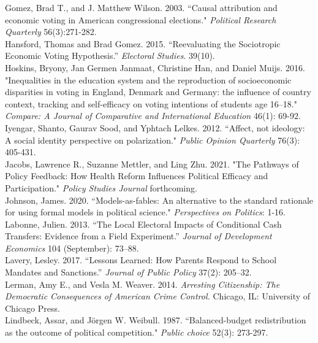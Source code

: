 \documentclass[12pt]{paper}
\begin{document}
\begin{hangparas}{.25in}{1}
Gomez, Brad T., and J. Matthew Wilson. 2003. ``Causal attribution and economic voting in American congressional elections." \textit{Political Research Quarterly} 56(3):271-282.
\\

Hansford, Thomas and Brad Gomez. 2015. ``Reevaluating the Sociotropic Economic Voting Hypothesis.” \textit{Electoral Studies}. 39(10).
\\

Hoskins, Bryony, Jan Germen Janmaat, Christine Han, and Daniel Muijs. 2016. "Inequalities in the education system and the reproduction of socioeconomic disparities in voting in England, Denmark and Germany: the influence of country context, tracking and self-efficacy on voting intentions of students age 16–18." \textit{Compare: A Journal of Comparative and International Education} 46(1): 69-92.
\\

Iyengar, Shanto, Gaurav Sood, and Yphtach Lelkes. 2012. ``Affect, not ideology: A social identity perspective on polarization." \textit{Public Opinion Quarterly} 76(3): 405-431.
\\

Jacobs, Lawrence R., Suzanne Mettler, and Ling Zhu. 2021. "The Pathways of Policy Feedback: How Health Reform Influences Political Efficacy and Participation." \textit{Policy Studies Journal} forthcoming.
\\

Johnson, James. 2020. ``Models-as-fables: An alternative to the standard rationale for using formal models in political science." \textit{Perspectives on Politics}: 1-16.
\\

Labonne, Julien. 2013. ``The Local Electoral Impacts of Conditional Cash Transfers: Evidence from a Field Experiment.” \textit{Journal of Development Economics} 104 (September): 73–88.
\\

Lavery, Lesley. 2017. “Lessons Learned: How Parents Respond to School Mandates and Sanctions.” \textit{Journal of Public Policy} 37(2): 205–32.
\\

Lerman, Amy E., and Vesla M. Weaver. 2014. \textit{Arresting Citizenship: The Democratic Consequences of American Crime Control.} Chicago, IL: University of Chicago Press.
\\

Lindbeck, Assar, and Jörgen W. Weibull. 1987. ``Balanced-budget redistribution as the outcome of political competition." \textit{Public choice} 52(3): 273-297.
\\


\end{hangparas}
\end{document}

